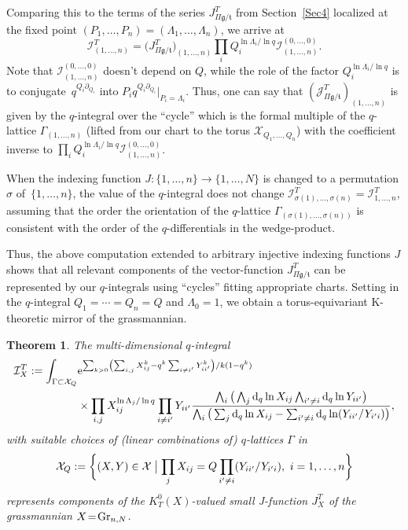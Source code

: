 \documentclass[10pt,a4paper]{amsart}
\numberwithin{equation}{section}
\newtheorem{Theorem}{Theorem}[section]
\def\I{\mathcal I}
\def\J{\mathcal J}
\def\X{\mathcal X}
\def\p{\partial}
\theoremstyle{definition}
\theoremstyle{plain}
\begin{document}
Comparing this to the terms of the series $J^T_{\Pi\mathfrak{g}/\mathfrak{t}}$ from Section~\ref{Sec4} localized at the fixed point $(P_1,\dots,P_n)=(\Lambda_1,\dots,\Lambda_n)$, we arrive at
\[
\I^T_{(1,\dots,n)}=\big(J^T_{\Pi\mathfrak{g}/\mathfrak{t}}\big)_{(1,\dots,n)} \prod_i Q_i^{\ln \Lambda_i/\ln q} \I^{(0,\dots,0)}_{(1,\dots,n)}.
\]
Note that $\I^{(0,\dots,0)}_{(1,\dots,n)}$ doesn't depend on $Q$, while the role of the factor $Q_i^{\ln \Lambda_i/\ln q}$ is to conjugate~$q^{Q_i\p_{Q_i}}$ into $P_i q^{Q_i\p_{Q_i}}|_{P_i=\Lambda_i}$. Thus, one can say that $(\J^T_{\Pi\mathfrak{g}/\mathfrak{t}})_{(1,\dots,n)}$ is given by the $q$-integral
over the ``cycle'' which is the formal multiple of the $q$-lattice $\Gamma_{(1,\dots,n)}$ (lifted from our chart to the torus $\X_{Q_1,\dots,Q_n}$) with the coefficient inverse to
$\prod_i Q_i^{\ln \Lambda_i/\ln q} \I^{(0,\dots,0)}_{(1,\dots,n)}$.

When the indexing function $J\colon\{1,\dots,n\}\to \{1,\dots,N\}$ is changed to
a permutation $\sigma$ of~$\{ 1,\dots, n\}$, the value of the $q$-integral does not change
$\I^T_{\sigma(1),\dots,\sigma(n)}=\I^T_{1,\dots,n}$, assuming that the order the orientation
of the $q$-lattice $\Gamma_{(\sigma(1),\dots,\sigma(n))}$ is consistent with the order of the
$q$-differentials in the wedge-product.

Thus, the above computation extended to arbitrary injective indexing functions $J$ shows that all relevant components of the vector-function $J^T_{\Pi \mathfrak{g}/\mathfrak{t}}$ can be represented by our $q$-integrals using ``cycles'' fitting appropriate charts.
Setting in the $q$-integral $Q_1=\cdots=Q_n=Q$ and $\Lambda_0=1$, we obtain a torus-equivariant K-theoretic mirror of the grassmannian.

\begin{Theorem}\label{thm7}
The multi-dimensional $q$-integral
\begin{align*}
\I_X^T :=\int_{\Gamma\subset \X_{Q}} &{\rm e}^{ \sum_{k>0}\left(\sum_{i,j}X_{ij}^k - q^k \sum_{i\neq i'}Y_{ii'}^k\right)/k(1-q^k)} \\
&\times \prod_{i,j}X_{ij}^{\ln \Lambda_j/\ln q} \prod_{i\neq i'} Y_{ii'} \frac{\bigwedge_i \big(\bigwedge_j {\rm d}_q\ln X_{ij} \bigwedge_{i'\neq i}{\rm d}_q \ln Y_{ii'}\big)}{\bigwedge_i \big( \sum_j{\rm d}_q\ln X_{ij} -\sum_{i'\neq i}{\rm d}_q\ln (Y_{ii'}/Y_{i'i})\big)},
\end{align*}
with suitable choices of (linear combinations of) $q$-lattices $\Gamma$ in
\[
\X_{Q}:=\bigg\{ (X,Y)\in \X \bigm| \prod_jX_{ij}=Q \prod_{i'\neq i}(Y_{ii'}/Y_{i'i}),\
i=1,\dots, n \bigg\}
\]
represents components of the $K^0_T(X)$-valued small J-function $J^T_X$ of the grassmannian \mbox{$X\!=\!{\rm Gr}_{n,N}$}.
\end{Theorem}
\end{document}
